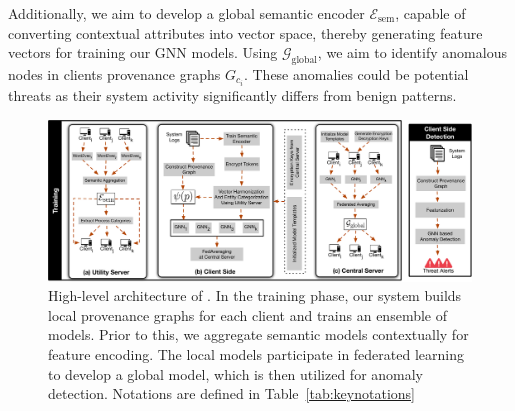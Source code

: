 Additionally, we aim to develop a global semantic encoder \( \mathcal{E}_{\text{sem}} \), capable of converting contextual attributes into vector space, thereby generating feature vectors for training our GNN models. Using \( \mathcal{G}_{\text{global}} \), we aim to identify anomalous nodes in clients provenance graphs \( G_{c_i}\). These anomalies could be potential threats as their system activity significantly differs from benign patterns.

\begin{figure}[t!]
  \centering
  \includegraphics[width=1\textwidth]{fig/archv3.pdf}
  \caption{High-level architecture of \Sys. In the training phase, our system builds local provenance graphs for each client and trains an ensemble of \gnnshort models. Prior to this, we aggregate semantic models contextually for feature encoding. The local \gnnshort models participate in federated learning to develop a global \gnnshort model, which is then utilized for anomaly detection. Notations are defined in Table~\ref{tab:keynotations}}
  \vspace{-3ex}
  \label{fig:arch}
\end{figure}


  



